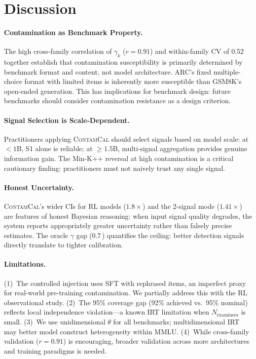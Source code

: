 \documentclass[11pt,a4paper]{article}
\newcommand{\contcal}{\textsc{ContamCal}}
\newcommand{\pp}{\,\text{pp}}
\begin{document}
\section{Discussion}

\paragraph{Contamination as Benchmark Property.}
The high cross-family correlation of $\gamma_k$ ($r=0.91$) and within-family CV of 0.52 together establish that contamination susceptibility is primarily determined by benchmark format and content, not model architecture.
ARC's fixed multiple-choice format with limited items is inherently more susceptible than GSM8K's open-ended generation.
This has implications for benchmark design: future benchmarks should consider contamination resistance as a design criterion.

\paragraph{Signal Selection is Scale-Dependent.}
Practitioners applying \contcal{} should select signals based on model scale: at $<1$B, S1 alone is reliable; at $\geq 1.5$B, multi-signal aggregation provides genuine information gain.
The Min-K++ reversal at high contamination is a critical cautionary finding: practitioners must not naively trust any single signal.

\paragraph{Honest Uncertainty.}
\contcal{}'s wider CIs for RL models ($1.8\times$) and the 2-signal mode ($1.41\times$) are features of honest Bayesian reasoning: when input signal quality degrades, the system reports appropriately greater uncertainty rather than falsely precise estimates.
The oracle $\gamma$ gap (0.7\pp{}) quantifies the ceiling: better detection signals directly translate to tighter calibration.

\paragraph{Limitations.}
(1)~The controlled injection uses SFT with rephrased items, an imperfect proxy for real-world pre-training contamination.
We partially address this with the RL observational study.
(2)~The 95\% coverage gap (92\% achieved vs.\ 95\% nominal) reflects local independence violation---a known IRT limitation when $N_{\text{examinees}}$ is small.
(3)~We use unidimensional $\theta$ for all benchmarks; multidimensional IRT \citep{reckase2009multidimensional} may better model construct heterogeneity within MMLU.
(4)~While cross-family validation ($r=0.91$) is encouraging, broader validation across more architectures and training paradigms is needed.
\end{document}
